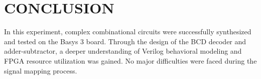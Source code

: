 \documentclass[12pt,a4paper]{article}
\begin{document}
\section{CONCLUSION}
In this experiment, complex combinational circuits were successfully synthesized and tested on the Basys 3 board. Through the design of the BCD decoder and adder-subtractor, a deeper understanding of Verilog behavioral modeling and FPGA resource utilization was gained. No major difficulties were faced during the signal mapping process.

\newpage
{}



\end{document}
